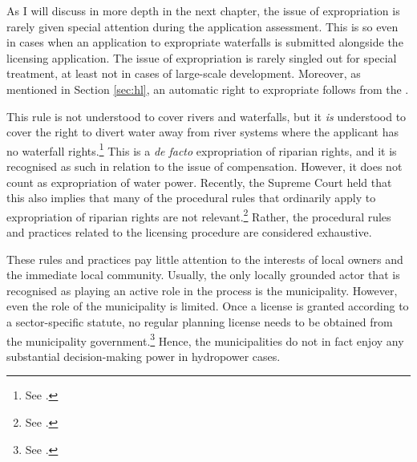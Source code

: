 %

As I will discuss in more depth in the next chapter, the issue of expropriation is rarely given special attention during the application assessment. This is so even in cases when an application to expropriate waterfalls is submitted alongside the licensing application. The issue of expropriation is rarely singled out for special treatment, at least not in cases of large-scale development. Moreover, as mentioned in Section \ref{sec:hl}, an automatic right to expropriate follows from the \cite[16]{wra17}.

This rule is not understood to cover rivers and waterfalls, but it {\it is} understood to cover the right to divert water away from river systems where the applicant has no waterfall rights.\footnote{See \cite{jorpeland11}.} This is a {\it de facto} expropriation of riparian rights, and it is recognised as such in relation to the issue of compensation. However, it does not count as expropriation of water power. Recently, the Supreme Court held that this also implies that many of the procedural rules that ordinarily apply to expropriation of riparian rights are not relevant.\footnote{See \cite{jorpeland11}.} Rather, the procedural rules and practices related to the licensing procedure are considered exhaustive.

These rules and practices pay little attention to the interests of local owners and the immediate local community. Usually, the only locally grounded actor that is recognised as playing an active role in the process is the municipality. However, even the role of the municipality is limited. Once a license is granted according to a sector-specific statute, no regular planning license needs to be obtained from the municipality government.\footnote{See \cite[12-1]{pb08}.} Hence, the municipalities do not in fact enjoy any substantial decision-making power in hydropower cases. 

